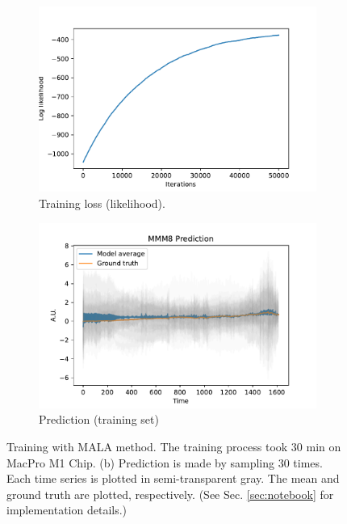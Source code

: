 \documentclass{article}
\begin{document}
\begin{figure}[h]
    \centering
    \begin{subfigure}[b]{0.5\textwidth}
        \centering
        \includegraphics[width=\textwidth]{../img/training_MALA_50000-iter.pdf}
        \caption{Training loss (likelihood).}
        \label{fig:training-log}
    \end{subfigure}%
    \begin{subfigure}[b]{0.5\textwidth}
        \centering
        \includegraphics[width=\textwidth]{../img/prediction_MALA_50000-iter.pdf}
        \caption{Prediction (training set)}
        \label{fig:pred-sub}
    \end{subfigure}
    \caption{Training with MALA method. The training process took $30$ min on MacPro M1 Chip. (b) Prediction is made by sampling $30$ times. Each time series is plotted in semi-transparent gray. The mean and ground truth are plotted, respectively. (See Sec. \ref{sec:notebook} for implementation details.)}
    \label{fig:pred}
\end{figure}
\end{document}

